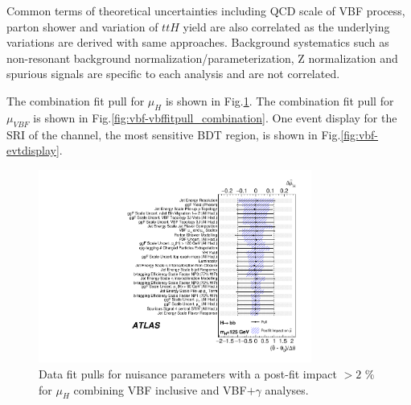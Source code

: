 Common terms of theoretical uncertainties including QCD scale of VBF process, parton shower and variation of $ttH$ yield are also correlated as the underlying variations are derived with same approaches. Background systematics such as non-resonant background normalization/parameterization, Z normalization and spurious signals are specific to each analysis and are not correlated.

The combination fit pull for $\mu_H$ is shown in Fig.\ref{fig:vbf-higgsfitpull_combination}. The combination fit pull for $\mu_{VBF}$ is shown in Fig.\ref{fig:vbf-vbffitpull_combination}. One event display for the SRI of the \twocentral channel, the most sensitive BDT region, is shown in Fig.\ref{fig:vbf-evtdisplay}.




\begin{figure}[htbp]
  \centering
 \includegraphics[width=0.8\textwidth]{figures/VBF/VBFHbb_Combined_pulls_125.pdf}
\caption{Data fit pulls for nuisance parameters with a post-fit impact $> 2$ \% for $\mu_H$ combining VBF inclusive and VBF$+\gamma$ analyses.}
  \label{fig:vbf-higgsfitpull_combination}
\end{figure}

